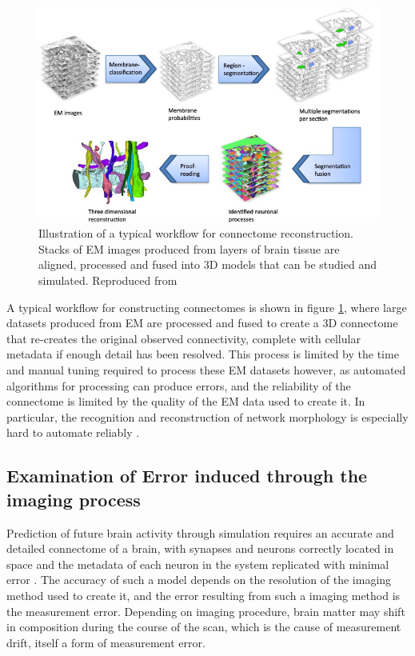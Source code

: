 \begin{figure}[h!]
    \centering
    \includegraphics[scale=0.75]{figures/images/reconstruction.jpg}
    \caption[Illustration of a typical workflow for connectome reconstruction]
        {Illustration of a typical workflow for connectome reconstruction.
        Stacks of EM images produced from layers of brain tissue are aligned,
        processed and fused into 3D models that can be studied and simulated.
        Reproduced from \cite{kaynig_large-scale_2015}}
    \label{reconstruction}
\end{figure}

A typical workflow for constructing
connectomes is shown in figure \ref{reconstruction}, where large datasets
produced from EM are processed and fused to create a 3D connectome that
re-creates the original observed connectivity, complete with cellular metadata
if enough detail has been resolved. This process is limited by the time and
manual tuning required to process these EM datasets however, as automated
algorithms for processing can produce errors, and the reliability of the
connectome is limited by the quality of the EM data used to create it. 
\autocite{pallotto_extracellular_2015} In
particular, the recognition and reconstruction of network morphology is
especially hard to automate reliably \autocite{helmstaedter_connectomic_2013}.

\subsection[Error induced through noise]{Examination of Error induced through the imaging process}

Prediction of future brain activity through simulation requires an accurate and
detailed connectome of a brain, with synapses and neurons correctly located in
space and the metadata of each neuron in the system replicated with minimal
error \autocite{bostrom_whole_2008}. The accuracy of such a model depends on the
resolution of the imaging method used to create it, and the error resulting from
such a imaging method is the measurement error. Depending on imaging procedure, brain matter may shift in composition during the course of the scan, which is the cause of measurement drift, itself a form of measurement error.

